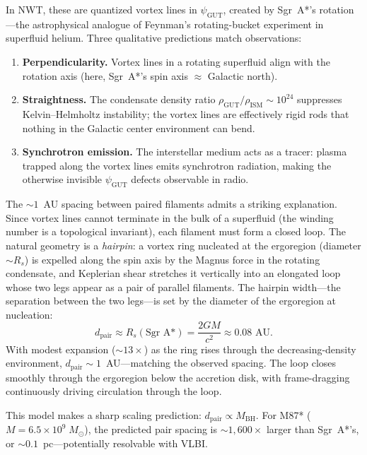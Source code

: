 \documentclass[11pt]{article}
\begin{document}
In NWT, these are quantized vortex lines in $\psi_\text{GUT}$, created by Sgr~A*'s rotation---the astrophysical analogue of Feynman's rotating-bucket experiment in superfluid helium.
Three qualitative predictions match observations:
\begin{enumerate}
\item \textbf{Perpendicularity.} Vortex lines in a rotating superfluid align with the rotation axis (here, Sgr~A*'s spin axis $\approx$ Galactic north).
\item \textbf{Straightness.} The condensate density ratio $\rho_\text{GUT}/\rho_\text{ISM} \sim 10^{24}$ suppresses Kelvin--Helmholtz instability; the vortex lines are effectively rigid rods that nothing in the Galactic center environment can bend.
\item \textbf{Synchrotron emission.} The interstellar medium acts as a tracer: plasma trapped along the vortex lines emits synchrotron radiation, making the otherwise invisible $\psi_\text{GUT}$ defects observable in radio.
\end{enumerate}

The $\sim 1$~AU spacing between paired filaments admits a striking explanation.
Since vortex lines cannot terminate in the bulk of a superfluid (the winding number is a topological invariant), each filament must form a closed loop.
The natural geometry is a \emph{hairpin}: a vortex ring nucleated at the ergoregion (diameter $\sim R_s$) is expelled along the spin axis by the Magnus force in the rotating condensate, and Keplerian shear stretches it vertically into an elongated loop whose two legs appear as a pair of parallel filaments.
The hairpin width---the separation between the two legs---is set by the diameter of the ergoregion at nucleation:
\begin{equation}
d_\text{pair} \approx R_s(\text{Sgr~A*}) = \frac{2GM}{c^2} \approx 0.08\text{~AU}.
\end{equation}
With modest expansion ($\sim 13\times$) as the ring rises through the decreasing-density environment, $d_\text{pair} \sim 1$~AU---matching the observed spacing.
The loop closes smoothly through the ergoregion below the accretion disk, with frame-dragging continuously driving circulation through the loop.

This model makes a sharp scaling prediction: $d_\text{pair} \propto M_\text{BH}$.
For M87* ($M = 6.5 \times 10^9\;M_\odot$), the predicted pair spacing is $\sim 1{,}600\times$ larger than Sgr~A*'s, or $\sim 0.1$~pc---potentially resolvable with VLBI.
\end{document}
